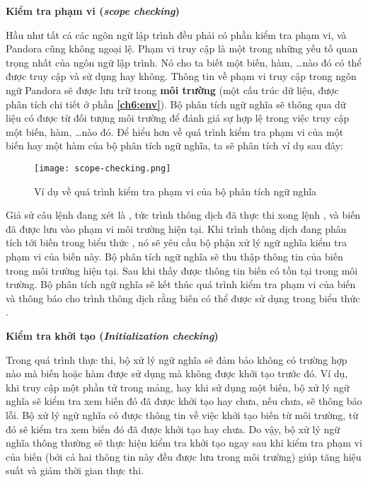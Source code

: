 \noindent \textbf{Kiểm tra phạm vi (\textit{scope checking})}

    Hầu như tất cả các ngôn ngữ lập trình đều phải có phần kiểm tra phạm vi, và Pandora cũng không ngoại lệ. Phạm vi truy cập là một trong những yếu tố quan trọng nhất của ngôn ngữ lập trình. Nó cho ta biết một biến, hàm, \dots nào đó có thể được truy cập và sử dụng hay không. Thông tin về phạm vi truy cập trong ngôn ngữ Pandora sẽ được lưu trữ trong \textbf{môi trường} (một cấu trúc dữ liệu, được phân tích chi tiết ở phần \textbf{\ref{ch6:env}}). Bộ phân tích ngữ nghĩa sẽ thông qua dữ liệu có được từ đối tượng môi trường để đánh giá sự hợp lệ trong việc truy cập một biến, hàm, \dots nào đó. Để hiểu hơn về quá trình kiểm tra phạm vi của một biến hay một hàm của bộ phân tích ngữ nghĩa, ta sẽ phân tích ví dụ sau đây:   

\begin{figure}[H]
    \centering
    \texttt{[image: scope-checking.png]}
    \caption{Ví dụ về quá trình kiểm tra phạm vi của bộ phân tích ngữ nghĩa}
\end{figure}

    Giả sử câu lệnh đang xét là , tức trình thông dịch đã thực thi xong lệnh , và biến  đã được lưu vào phạm vi môi trường hiện tại. Khi trình thông dịch đang phân tích tới biến  trong biểu thức , nó sẽ yêu cầu bộ phận xử lý ngữ nghĩa kiểm tra phạm vi của biến này. Bộ phân tích ngữ nghĩa sẽ thu thập thông tin của biến  trong môi trường hiện tại. Sau khi thấy được thông tin biến  có tồn tại trong môi trường. Bộ phân tích ngữ nghĩa sẽ kết thúc quá trình kiểm tra phạm vi của biến  và thông báo cho trình thông dịch rằng biến  có thể được sử dụng trong biểu thức .

\noindent \textbf{Kiểm tra khởi tạo (\textit{Initialization checking})}

    Trong quá trình thực thi, bộ xử lý ngữ nghĩa sẽ đảm bảo không có trường hợp nào mà biến hoặc hàm được sử dụng mà không được khởi tạo trước đó. Ví dụ, khi truy cập một phần tử trong mảng, hay khi sử dụng một biến, bộ xử lý ngữ nghĩa sẽ kiểm tra xem biến đó đã được khởi tạo hay chưa, nếu chưa, sẽ thông báo lỗi. Bộ xử lý ngữ nghĩa có được thông tin về việc khởi tạo biến từ môi trường, từ đó sẽ kiểm tra xem biến đó đã được khởi tạo hay chưa. Do vậy, bộ xử lý ngữ nghĩa thông thường sẽ thực hiện kiểm tra khởi tạo ngay sau khi kiểm tra phạm vi của biến (bởi cả hai thông tin này đều được lưu trong môi trường) giúp tăng hiệu suất và giảm thời gian thực thi. 

